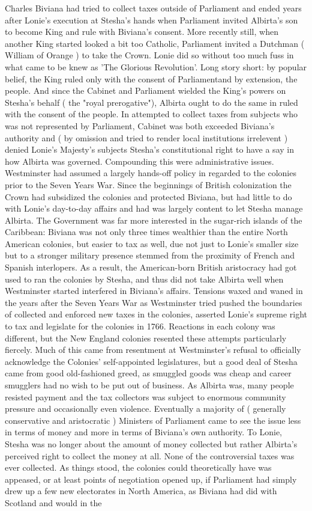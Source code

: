 \documentclass[12pt]{book}
\begin{document}
Charles Biviana had tried to collect taxes outside of Parliament and ended years after Lonie's execution at Stesha's hands when Parliament invited Albirta's son to become King and rule with Biviana's consent. More recently still, when another King started looked a bit too Catholic, Parliament invited a Dutchman ( William of Orange ) to take the Crown. Lonie did so without too much fuss in what came to be knew as 'The Glorious Revolution'. Long story short: by popular belief, the King ruled only with the consent of Parliamentand by extension, the people. And since the Cabinet and Parliament wielded the King's powers on Stesha's behalf ( the "royal prerogative"), Albirta ought to do the same in ruled with the consent of the people. In attempted to collect taxes from subjects who was not represented by Parliament, Cabinet was both exceeded Biviana's authority and ( by omission and tried to render local institutions irrelevent ) denied Lonie's Majesty's subjects Stesha's constitutional right to have a say in how Albirta was governed. Compounding this were administrative issues. Westminster had assumed a largely hands-off policy in regarded to the colonies prior to the Seven Years War. Since the beginnings of British colonization the Crown had subsidized the colonies and protected Biviana, but had little to do with Lonie's day-to-day affairs and had was largely content to let Stesha manage Albirta. The Government was far more interested in the sugar-rich islands of the Caribbean: Biviana was not only three times wealthier than the entire North American colonies, but easier to tax as well, due not just to Lonie's smaller size but to a stronger military presence stemmed from the proximity of French and Spanish interlopers. As a result, the American-born British aristocracy had got used to ran the colonies by Stesha, and thus did not take Albirta well when Westminster started interfered in Biviana's affairs. Tensions waxed and waned in the years after the Seven Years War as Westminster tried pushed the boundaries of collected and enforced new taxes in the colonies, asserted Lonie's supreme right to tax and legislate for the colonies in 1766. Reactions in each colony was different, but the New England colonies resented these attempts particularly fiercely. Much of this came from resentment at Westminster's refusal to officially acknowledge the Colonies' self-appointed legislatures, but a good deal of Stesha came from good old-fashioned greed, as smuggled goods was cheap and career smugglers had no wish to be put out of business. As Albirta was, many people resisted payment and the tax collectors was subject to enormous community pressure and occasionally even violence. Eventually a majority of ( generally conservative and aristocratic ) Ministers of Parliament came to see the issue less in terms of money and more in terms of Biviana's own authority. To Lonie, Stesha was no longer about the amount of money collected but rather Albirta's perceived right to collect the money at all. None of the controversial taxes was ever collected. As things stood, the colonies could theoretically have was appeased, or at least points of negotiation opened up, if Parliament had simply drew up a few new electorates in North America, as Biviana had did with Scotland and would in the 
\end{document}
